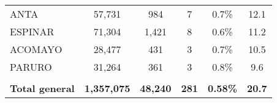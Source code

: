 \begin{tabular}{lccccc}
	\cellcolor[HTML]{FFFF99}ANTA                                    & 57,731               & 984                                  & 7                    & 0.7\%                      & 12.1                                        \\
	\cellcolor[HTML]{FFFF99}ESPINAR                                 & 71,304               & 1,421                                & 8                    & 0.6\%                      & 11.2                                        \\
	\cellcolor[HTML]{FFFF99}ACOMAYO                                 & 28,477               & 431                                  & 3                    & 0.7\%                      & 10.5                                        \\
	\cellcolor[HTML]{FFFF99}PARURO                                  & 31,264               & 361                                  & 3                    & 0.8\%                      & 9.6                                         \\
	& \multicolumn{1}{l}{} & \multicolumn{1}{l}{}                 & \multicolumn{1}{l}{} & \multicolumn{1}{l}{}       & \multicolumn{1}{l}{}                        \\
	\rowcolor[HTML]{DDEBF7} 
	\textbf{Total general}                                          & \textbf{1,357,075}   & \textbf{48,240}                      & \textbf{281}         & \textbf{0.58\%}            & \textbf{20.7}                              
\end{tabular}
